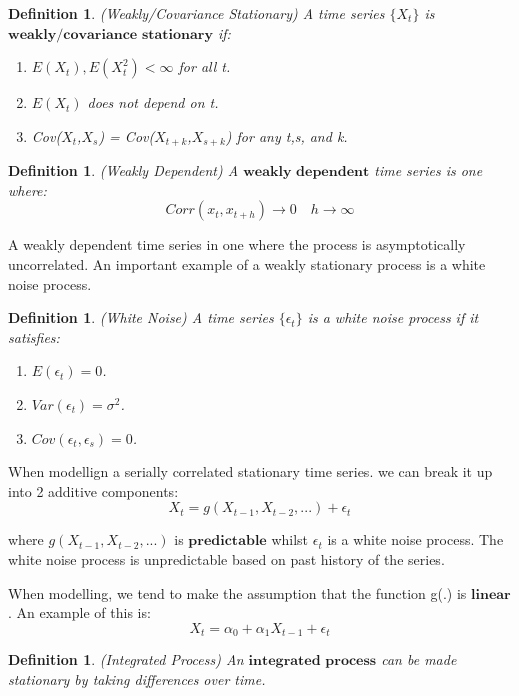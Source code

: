 \documentclass[twoside]{article}
\newtheorem{definition}[theorem]{Definition}
\begin{document}
\begin{definition}
(Weakly/Covariance Stationary) A time series $\{X_t\}$ is $\textbf{weakly/covariance stationary}$ if:
\begin{enumerate}
  \item $E(X_t), E(X_{t}^{2}) < \infty$ for all t.
  \item $E(X_t)$ does not depend on t.
  \item Cov($X_t$,$X_s$) = Cov($X_{t+k}$,$X_{s+k}$) for any t,s, and k.
\end{enumerate}
\end{definition}

\begin{definition}
(Weakly Dependent) A $\textbf{weakly dependent}$ time series is one where:
$$
Corr(x_t,x_{t+h}) \rightarrow 0 \quad h \rightarrow \infty
$$
\end{definition}

A weakly dependent time series in one where the process is asymptotically uncorrelated. An important example of a weakly stationary process is a white noise process.

\begin{definition}
(White Noise) A time series $\{\epsilon_t\}$ is a white noise process if it satisfies:
\begin{enumerate}
  \item $E(\epsilon_t) = 0$.
  \item $Var(\epsilon_t) = \sigma^2$.
  \item $Cov(\epsilon_t, \epsilon_s) = 0$.
\end{enumerate}
\end{definition}

When modellign a serially correlated stationary time series. we can break it up into 2 additive components:
$$
X_t = g(X_{t-1}, X_{t-2}, ...) + \epsilon_t
$$

where $g(X_{t-1}, X_{t-2}, ...)$ is $\textbf{predictable}$ whilst $\epsilon_t$ is a white noise process. The white noise process is unpredictable based on past history of the series.

When modelling, we tend to make the assumption that the function g(.) is $\textbf{linear}$. An example of this is:
$$
X_t = \alpha_0 + \alpha_1 X_{t-1} + \epsilon_t 
$$

\begin{definition}
(Integrated Process) An $\textbf{integrated process}$ can be made stationary by taking differences over time. 
\end{definition}
\end{document}
